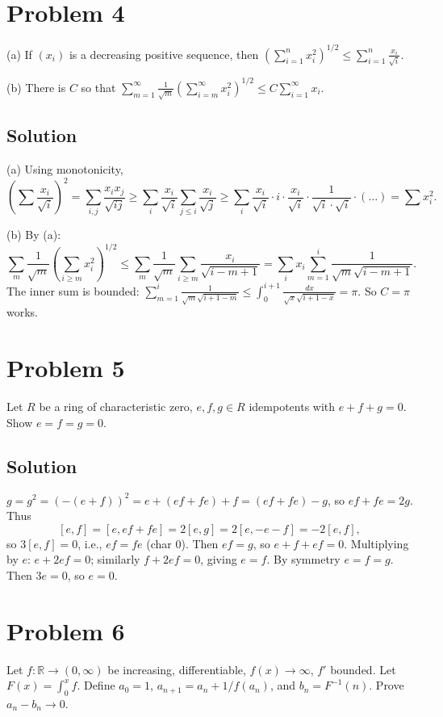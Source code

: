 \documentclass{article}
\begin{document}
\section*{Problem 4}
(a) If $(x_i)$ is a decreasing positive sequence, then $\left(\sum_{i=1}^n x_i^2\right)^{1/2} \le \sum_{i=1}^n \frac{x_i}{\sqrt i}$.

(b) There is $C$ so that $\sum_{m=1}^\infty \frac{1}{\sqrt m}\left(\sum_{i=m}^\infty x_i^2\right)^{1/2} \le C\sum_{i=1}^\infty x_i$.

\subsection*{Solution}
(a) Using monotonicity,
\[\left(\sum \frac{x_i}{\sqrt i}\right)^2 = \sum_{i,j}\frac{x_ix_j}{\sqrt{ij}}\ge \sum_i \frac{x_i}{\sqrt i}\sum_{j\le i}\frac{x_i}{\sqrt j}\ge \sum_i \frac{x_i}{\sqrt i}\cdot i\cdot\frac{x_i}{\sqrt i}\cdot\frac{1}{\sqrt i\cdot\sqrt i}\cdot(\dots) = \sum x_i^2.\]

(b) By (a):
\[\sum_m \frac{1}{\sqrt m}\left(\sum_{i\ge m} x_i^2\right)^{1/2} \le \sum_m \frac{1}{\sqrt m}\sum_{i\ge m}\frac{x_i}{\sqrt{i-m+1}} = \sum_i x_i \sum_{m=1}^i \frac{1}{\sqrt m \sqrt{i-m+1}}.\]
The inner sum is bounded: $\sum_{m=1}^i \frac{1}{\sqrt m \sqrt{i+1-m}}\le \int_0^{i+1}\frac{dx}{\sqrt x\sqrt{i+1-x}}=\pi$. So $C=\pi$ works.

\section*{Problem 5}
Let $R$ be a ring of characteristic zero, $e,f,g\in R$ idempotents with $e+f+g=0$. Show $e=f=g=0$.

\subsection*{Solution}
$g = g^2 = (-(e+f))^2 = e + (ef+fe) + f = (ef+fe) - g$, so $ef+fe=2g$. Thus
\[[e,f] = [e, ef+fe] = 2[e,g] = 2[e,-e-f] = -2[e,f],\]
so $3[e,f]=0$, i.e., $ef=fe$ (char 0). Then $ef=g$, so $e+f+ef=0$. Multiplying by $e$: $e+2ef=0$; similarly $f+2ef=0$, giving $e=f$. By symmetry $e=f=g$. Then $3e=0$, so $e=0$.

\section*{Problem 6}
Let $f:\mathbb{R}\to(0,\infty)$ be increasing, differentiable, $f(x)\to\infty$, $f'$ bounded. Let $F(x)=\int_0^x f$. Define $a_0=1$, $a_{n+1}=a_n+1/f(a_n)$, and $b_n=F^{-1}(n)$. Prove $a_n-b_n\to 0$.
\end{document}
